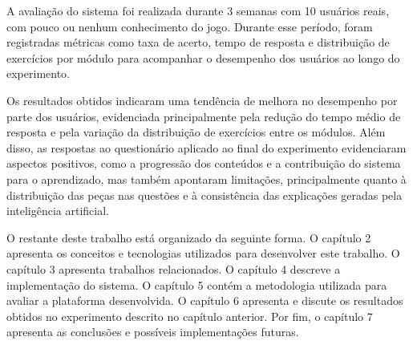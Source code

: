     A avaliação do sistema foi realizada durante 3 semanas com 10 usuários reais, com pouco ou nenhum conhecimento do jogo. Durante esse período, 
    foram registradas métricas como taxa de acerto, tempo de resposta e distribuição de exercícios por módulo para
    acompanhar o desempenho dos usuários ao longo do experimento.
    
    Os resultados obtidos indicaram uma tendência de melhora no desempenho por parte dos usuários, evidenciada principalmente pela redução do tempo médio
    de resposta e pela variação da distribuição de exercícios entre os módulos. Além disso, as respostas ao questionário aplicado ao final 
    do experimento evidenciaram aspectos positivos, como a progressão dos conteúdos e a contribuição do sistema para o aprendizado, 
    mas também apontaram limitações, principalmente quanto à distribuição das peças nas questões e à consistência das explicações geradas 
    pela inteligência artificial.

    O restante deste trabalho está organizado da seguinte forma. O capítulo 2 apresenta os conceitos e tecnologias
    utilizados para desenvolver este trabalho. O capítulo 3 apresenta trabalhos relacionados. O capítulo 4 descreve a implementação
    do sistema. O capítulo 5 contém a metodologia utilizada para avaliar a plataforma desenvolvida. O capítulo 6 
    apresenta e discute os resultados obtidos no experimento descrito no capítulo anterior. Por fim, o capítulo 7
    apresenta as conclusões e possíveis implementações futuras.